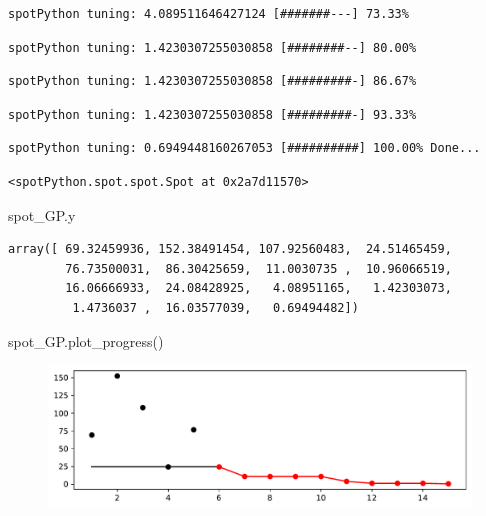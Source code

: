 \documentclass[
  letterpaper,
  DIV=11,
  numbers=noendperiod]{scrreprt}
\newenvironment{Shaded}{\begin{snugshade}}{\end{snugshade}}
\newcommand{\NormalTok}[1]{\textcolor[rgb]{0.00,0.23,0.31}{#1}}
\begin{document}
\begin{verbatim}
spotPython tuning: 4.089511646427124 [#######---] 73.33% 
\end{verbatim}

\begin{verbatim}
spotPython tuning: 1.4230307255030858 [########--] 80.00% 
\end{verbatim}

\begin{verbatim}
spotPython tuning: 1.4230307255030858 [#########-] 86.67% 
\end{verbatim}

\begin{verbatim}
spotPython tuning: 1.4230307255030858 [#########-] 93.33% 
\end{verbatim}

\begin{verbatim}
spotPython tuning: 0.6949448160267053 [##########] 100.00% Done...
\end{verbatim}

\begin{verbatim}
<spotPython.spot.spot.Spot at 0x2a7d11570>
\end{verbatim}

\begin{Shaded}
\begin{Highlighting}[]
\NormalTok{spot\_GP.y}
\end{Highlighting}
\end{Shaded}

\begin{verbatim}
array([ 69.32459936, 152.38491454, 107.92560483,  24.51465459,
        76.73500031,  86.30425659,  11.0030735 ,  10.96066519,
        16.06666933,  24.08428925,   4.08951165,   1.42303073,
         1.4736037 ,  16.03577039,   0.69494482])
\end{verbatim}

\begin{Shaded}
\begin{Highlighting}[]
\NormalTok{spot\_GP.plot\_progress()}
\end{Highlighting}
\end{Shaded}

\begin{figure}[H]

{\centering \includegraphics{07_spot_ei_files/figure-pdf/cell-35-output-1.pdf}

}

\end{figure}
\end{document}

